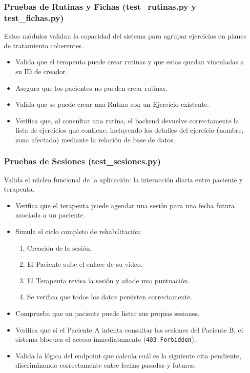 \subsubsection{Pruebas de Rutinas y Fichas (test\_rutinas.py y test\_fichas.py)}
Estos módulos validan la capacidad del sistema para agrupar ejercicios en planes de tratamiento coherentes.

\begin{itemize}
    \item Valida que el terapeuta puede crear rutinas y que estas quedan vinculadas a su ID de creador.
    \item Asegura que los pacientes no pueden crear rutinas.
    \item Valida que se puede crear una Rutina con un Ejercicio existente.
    \item Verifica que, al consultar una rutina, el backend devuelve correctamente la lista de ejercicios que contiene, incluyendo los detalles del ejercicio (nombre, zona afectada) mediante la relación de base de datos.
\end{itemize}

\subsubsection{Pruebas de Sesiones (test\_sesiones.py)}
Valida el núcleo funcional de la aplicación: la interacción diaria entre paciente y terapeuta.

\begin{itemize}
    \item Verifica que el terapeuta puede agendar una sesión para una fecha futura asociada a un paciente.
    \item Simula el ciclo completo de rehabilitación:
    \begin{enumerate}
        \item Creación de la sesión.
        \item El Paciente sube el enlace de su vídeo.
        \item El Terapeuta revisa la sesión y añade una puntuación.
        \item Se verifica que todos los datos persisten correctamente.
    \end{enumerate}
    \item Comprueba que un paciente puede listar sus propias sesiones.
    \item Verifica que si el Paciente A intenta consultar las sesiones del Paciente B, el sistema bloquea el acceso inmediatamente (\texttt{403 Forbidden}).
    \item Valida la lógica del endpoint que calcula cuál es la siguiente cita pendiente, discriminando correctamente entre fechas pasadas y futuras.
\end{itemize}

